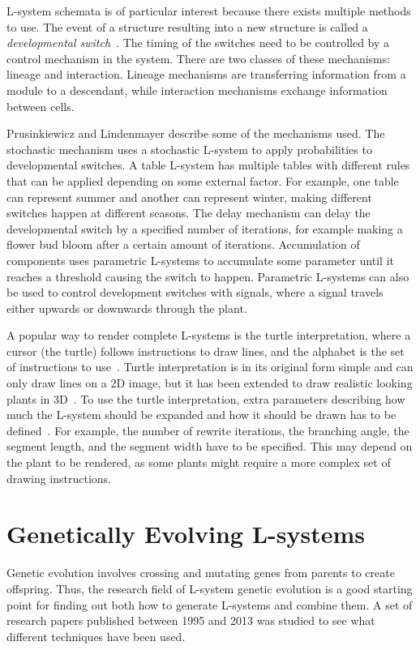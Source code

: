 \gls{L-system} schemata is of particular interest because there exists multiple methods to use.
The event of a structure resulting into a new structure is called a {\it developmental switch}~\cite{2012Prusinkiewicz}.
The timing of the switches need to be controlled by a control mechanism in the system.
There are two classes of these mechanisms: lineage and interaction.
Lineage mechanisms are transferring information from a module to a descendant, while interaction mechanisms exchange information between cells.

Prusinkiewicz and Lindenmayer describe some of the mechanisms used.
The stochastic mechanism uses a stochastic \gls{L-system} to apply probabilities to developmental switches.
A table \gls{L-system} has multiple tables with different rules that can be applied depending on some external factor.
For example, one table can represent summer and another can represent winter, making different switches happen at different seasons.
The delay mechanism can delay the developmental switch by a specified number of iterations, for example making a flower bud bloom after a certain amount of iterations.
Accumulation of components uses parametric \glspl{L-system} to accumulate some parameter until it reaches a threshold causing the switch to happen.
Parametric \glspl{L-system} can also be used to control development switches with signals, where a signal travels either upwards or downwards through the plant.~\cite{2012Prusinkiewicz}

A popular way to render complete \glspl{L-system} is the turtle interpretation, where a cursor (the turtle) follows instructions to draw lines, and the alphabet is the set of instructions to use~\cite{2012Prusinkiewicz}.
Turtle interpretation is in its original form simple and can only draw lines on a 2D image, but it has been extended to draw realistic looking plants in 3D~\cite{2012Prusinkiewicz}.
To use the turtle interpretation, extra parameters describing how much the \gls{L-system} should be expanded and how it should be drawn has to be defined~\cite{2012Prusinkiewicz}.
For example, the number of rewrite iterations, the branching angle, the segment length, and the segment width have to be specified.
This may depend on the plant to be rendered, as some plants might require a more complex set of drawing instructions.

\section{Genetically Evolving L-systems}
Genetic evolution involves crossing and mutating genes from parents to create offspring.
Thus, the research field of \gls{L-system} genetic evolution is a good starting point for finding out both how to generate \glspl{L-system} and combine them.
A set of research papers published between 1995 and 2013 was studied to see what different techniques have been used.

